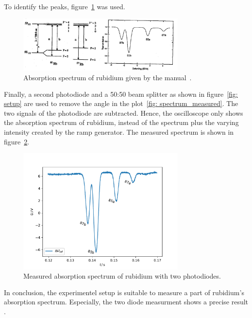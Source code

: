 To identify the peaks, figure~\ref{fig: spectrum_manual} was used.
\begin{figure}
  \centering
  \includegraphics[width = 0.75\textwidth]{./content/images/absorption_spectrum_rubidium.png}
  \caption{Absorption spectrum of rubidium given by the manual~\cite{anleitung60}.}
  \label{fig: spectrum_manual}
\end{figure}
Finally, a second photodiode and a 50:50 beam splitter as shown in figure~\ref{fig: setup}
are used to remove the angle in the plot~\ref{fig: spectrum_measured}. The two signals of
the photodiode are subtracted. Hence, the oscilloscope only shows the
absorption spectrum of rubidium, instead of the spectrum plus the varying intensity created by the
ramp generator. The measured spectrum is shown in figure~\ref{fig: spectrum_measured_straight}.
\begin{figure}
  \centering
  \includegraphics[width = 0.75\textwidth]{../analysis/plots/spectrum_straight.pdf}
  \caption{Measured absorption spectrum of rubidium with two photodiodes.}
  \label{fig: spectrum_measured_straight}
\end{figure}
In conclusion, the experimentel setup is suitable to measure a part of
rubidium's absorption spectrum. Especially, the two diode measurment shows
a precise result
.
